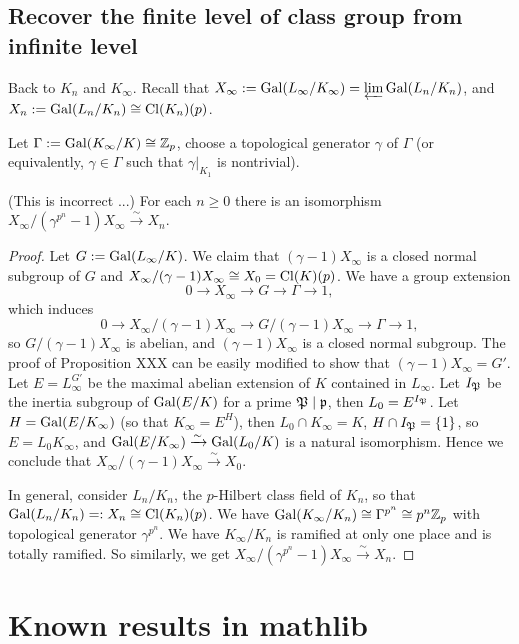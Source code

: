 \subsection{Recover the finite level of class group from infinite level}

Back to $K_n$ and $K_\infty$.
Recall that $X_\infty:={\mathrm{Gal}}(L_\infty/K_\infty)=\varprojlim{\mathrm{Gal}}(L_n/K_n)$,
and $X_n:={\mathrm{Gal}}(L_n/K_n)\cong{\mathrm{Cl}}(K_n)(p)$.

Let $\Gamma:={\mathrm{Gal}}(K_\infty/K)\cong{\mathbb {Z}}_p$, choose a topological
generator $\gamma$ of $\Gamma$ (or equivalently, $\gamma\in\Gamma$
such that $\gamma|_{K_1}$ is nontrivial).

\begin{prop}
\label{X-inf-coinv-is-X-n}
(This is incorrect ...)
For each $n\geq 0$ there is an isomorphism
$X_\infty/(\gamma^{p^n}-1)X_\infty\xrightarrow\sim
X_n$.
\end{prop}

\begin{proof}
Let $G:={\mathrm{Gal}}(L_\infty/K)$.
We claim that $(\gamma-1)X_\infty$ is a closed normal subgroup of $G$
and $X_\infty/(\gamma-1)X_\infty\cong X_0={\mathrm{Cl}}(K)(p)$. We have a group extension
$$
0\to X_\infty\to G\to\Gamma\to 1,
$$
which induces
$$
0\to X_\infty/(\gamma-1)X_\infty\to G/(\gamma-1)X_\infty\to\Gamma\to 1,
$$
so $G/(\gamma-1)X_\infty$ is abelian, and $(\gamma-1)X_\infty$
is a closed normal subgroup.
The proof of Proposition XXX can be easily modified to
show that $(\gamma-1)X_\infty=G'$.
Let $E=L_\infty^{G'}$ be the maximal abelian extension
of $K$ contained in $L_\infty$. Let $I_{\mathfrak{P}}$ be the inertia
subgroup of ${\mathrm{Gal}}(E/K)$ for a prime ${\mathfrak{P}}\mid{\mathfrak{p}}$,
then $L_0=E^{I_{\mathfrak{P}}}$. Let $H={\mathrm{Gal}}(E/K_\infty)$
(so that $K_\infty=E^H$), then $L_0\cap K_\infty=K$,
$H\cap I_{\mathfrak{P}}=\{1\}$, so $E=L_0K_\infty$,
and ${\mathrm{Gal}}(E/K_\infty)\xrightarrow\sim{\mathrm{Gal}}(L_0/K)$
is a natural isomorphism.
Hence we conclude that $X_\infty/(\gamma-1)X_\infty\xrightarrow\sim X_0$.

In general, consider $L_n/K_n$, the $p$-Hilbert class field of $K_n$,
so that ${\mathrm{Gal}}(L_n/K_n)=:X_n\cong{\mathrm{Cl}}(K_n)(p)$.
We have ${\mathrm{Gal}}(K_\infty/K_n)\cong\Gamma^{p^n}\cong p^n{\mathbb {Z}}_p$
with topological generator $\gamma^{p^n}$.
We have $K_\infty/K_n$ is ramified at only one place and is
totally ramified. So similarly, we get $X_\infty/(\gamma^{p^n}-1)X_\infty\xrightarrow\sim
X_n$.
\end{proof}
\fi

\appendix

\section{Known results in mathlib}

